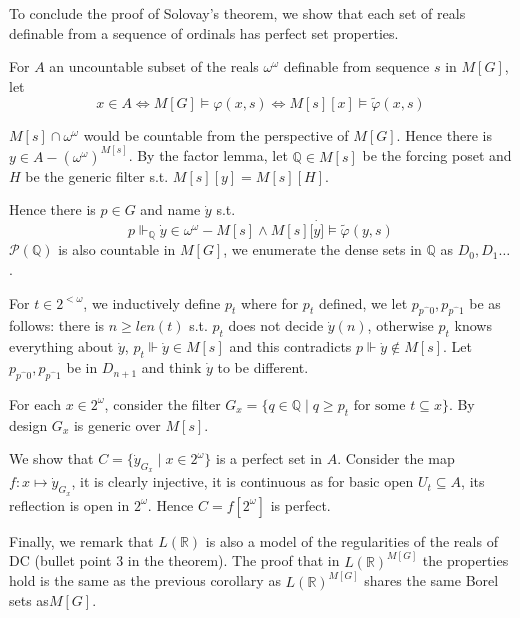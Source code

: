\documentclass{article}
\newcommand{\bbQ}{\mathbb{Q}}
\begin{document}
To conclude the proof of Solovay's theorem, we show that each set of reals definable from a sequence of ordinals has perfect set properties.

For $A$ an uncountable subset of the reals $\omega^\omega$ definable from sequence $s$ in $M[G]$, let $$x\in A\iff M[G]\models \varphi(x,s)\iff M[s][x]\models \tilde{\varphi}(x,s)$$

$M[s]\cap \omega^\omega$ would be countable from the perspective of $M[G]$. Hence there is $y\in A - (\omega^\omega)^{M[s]}$. By the factor lemma, let $\bbQ\in M[s]$ be the forcing poset and $H$ be the generic filter s.t. $M[s][y] = M[s][H]$.

Hence there is $p\in G$ and name $\dot{y}$ s.t. $$p\Vdash_\bbQ  \dot{y}\in \omega^{\omega} - M[s]\land M[s][\dot{y]}\models \tilde{\varphi}(y,s)$$
$\mathcal{P}(\bbQ)$ is also countable in $M[G]$, we enumerate the dense sets in $\bbQ$ as $D_0,D_1\dots$.

For $t\in 2^{<\omega}$, we inductively define $p_t$ where for $p_t$ defined, we let $p_{p\widehat{\phantom{x}}0},p_{p\widehat{\phantom{x}}1}$ be as follows: there is $n\geq len(t)$ s.t. $p_t$ does not decide $\dot{y}(n)$, otherwise $p_t$ knows everything about $\dot{y}$, $p_t\Vdash \dot{y}\in M[s]$ and this contradicts $p\Vdash \dot{y}\not\in M[s]$. Let $p_{p\widehat{\phantom{x}}0},p_{p\widehat{\phantom{x}}1}$ be in $D_{n+1}$ and think $\dot{y}$ to be different. 

For each $x\in 2^\omega$, consider the filter $G_x = \{q\in \bbQ\mid q\geq p_t\text{ for some }t\subseteq x\}$. By design $G_x$ is generic over $M[s]$.

We show that $C = \{\dot{y}_{G_x}\mid x\in 2^\omega\}$ is a perfect set in $A$. Consider the map $f: x\mapsto \dot{y}_{G_x}$, it is clearly injective, it is continuous as for basic open $U_t\subseteq A$, its reflection is open in $2^\omega$. Hence $C = f[2^\omega]$ is perfect.

Finally, we remark that $L(\mathbb{R})$ is also a model of the regularities of the reals of DC (bullet point 3 in the theorem). The proof that in $L(\mathbb{R})^{M[G]}$ the properties hold is the same as the previous corollary as $L(\mathbb{R})^{M[G]}$ shares the same Borel sets as$M[G]$. 



\end{document}
